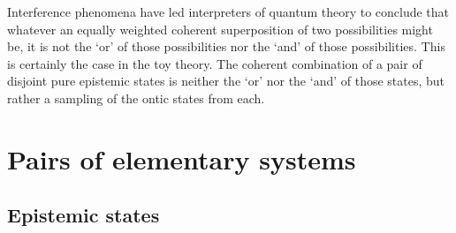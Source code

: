 \documentclass[pra,nofootinbib,showpacs,12pt]{revtex4}
\begin{document}

Interference phenomena have led interpreters of quantum theory to conclude
that whatever an equally weighted coherent superposition of two
possibilities might be, it is not the `or' of those possibilities nor the
`and' of those possibilities. This is certainly the case in the toy theory.
The coherent combination of a pair of disjoint pure epistemic states is
neither the `or' nor the `and' of those states, but rather a sampling of the
ontic states from each.

\section{Pairs of elementary systems}

\label{2systems}

\subsection{Epistemic states}

\label{epistemicstates2}
\end{document}
